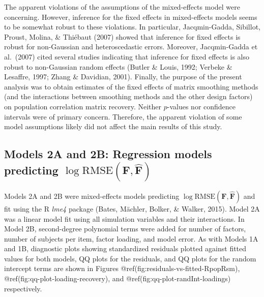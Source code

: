 \begin{appendix}
The apparent violations of the assumptions of the mixed-effects model
were concerning. However, inference for the fixed effects in
mixed-effects models seems to be somewhat robust to these violations. In
particular, Jacqmin-Gadda, Sibillot, Proust, Molina, \& Thiébaut (2007)
showed that inference for fixed effects is robust for non-Gaussian and
heteroscedastic errors. Moreover, Jacqmin-Gadda et al.~(2007) cited
several studies indicating that inference for fixed effects is also
robust to non-Gaussian random effects (Butler \& Louis, 1992; Verbeke \&
Lesaffre, 1997; Zhang \& Davidian, 2001). Finally, the purpose of the
present analysis was to obtain estimates of the fixed effects of matrix
smoothing methods (and the interactions between smoothing methods and
the other design factors) on population correlation matrix recovery.
Neither \(p\)-values nor confidence intervals were of primary concern.
Therefore, the apparent violation of some model assumptions likely did
not affect the main results of this study.

\hypertarget{models-2a-and-2b-regression-models-predicting-log-textrmrmsemathbff-hatmathbff}{%
\subsection{\texorpdfstring{Models 2A and 2B: Regression models
predicting
\(\log \textrm{RMSE}(\mathbf{F}, \hat{\mathbf{F}})\)}{Models 2A and 2B: Regression models predicting \textbackslash log \textbackslash textrm\{RMSE\}(\textbackslash mathbf\{F\}, \textbackslash hat\{\textbackslash mathbf\{F\}\})}}\label{models-2a-and-2b-regression-models-predicting-log-textrmrmsemathbff-hatmathbff}}

Models 2A and 2B were mixed-effects models predicting
\(\log \textrm{RMSE}(\mathbf{F}, \hat{\mathbf{F}})\) and fit using the R
\emph{lme4} package (Bates, Mächler, Bolker, \& Walker, 2015). Model 2A
was a linear model fit using all simulation variables and their
interactions. In Model 2B, second-degree polynomial terms were added for
number of factors, number of subjects per item, factor loading, and
model error. As with Models 1A and 1B, diagnostic plots showing
standardized residuals plotted against fitted values for both models, QQ
plots for the residuals, and QQ plots for the random intercept terms are
shown in Figures @ref(fig:residuals-vs-fitted-RpopRsm),
@ref(fig:qq-plot-loading-recovery), and
@ref(fig:qq-plot-randInt-loadings) respectively.

\begin{figure}


\end{figure}
\end{appendix}
